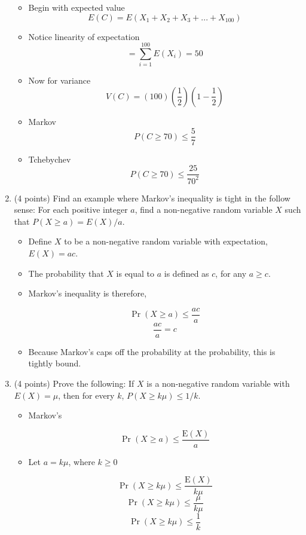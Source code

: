 \documentclass[11pt]{article}
\begin{document}
\begin{enumerate}
\begin{itemize}

	\item Begin with expected value
	      \[ E(C) = E(X_1 + X_2 + X_3 + ... + X_{100}) \]
	\item Notice linearity of expectation
	      \[ = \sum_{i = 1}^{100} E(X_i)  = 50 \]
	\item Now for variance
	      \[ V(C) = (100)\left(\frac{1}{2}\right)\left(1 - \frac{1}{2}\right) \]
	\item Markov
	      \[ P(C \ge 70) \le \frac{5}{7} \]
	\item Tchebychev
         \[ P(C \ge 70) \le \frac{25}{70^2} \]
         
\end{itemize}

\item (4 points) Find an example where Markov's inequality is tight in the
follow sense: For each  positive integer $a$, find a non-negative random
variable $X$ such that $P(X \geq a) = E(X)/a$.

	\begin{itemize}
		\item Define $X$ to be a non-negative random variable with expectation, $E(X) = ac$.
		\item The probability that $X$ is equal to $a$ is defined as $c$, for any $a \geq c$.
		\item Markov's inequality is therefore,
		
	         \[ \Pr(X \geq a) \leq \frac{ac}{a} \]
	         \[ \frac{ac}{a} = c\]
	         
	   \item Because Markov's caps off the probability at the probability, this is tightly bound.
	\end{itemize}

\item (4 points) Prove the following: If $X$ is a non-negative random variable
with $E(X) = \mu$, then for every $k$, $P(X \geq k\mu) \leq 1/k$.

\begin{itemize}

	\item Markov's
	
	     \[\Pr(X \geq a) \leq \frac{\textrm{E}(X)}{a}\]
	     
	\item Let $a = k\mu$, where $k \geq 0$
	
	     \[ \Pr(X \geq  k\mu) \leq \frac{\textrm{E}(X)}{ k\mu}\]
	     \[ \Pr(X \geq  k\mu) \leq \frac{\mu}{ k\mu}\]
	     \[ \Pr(X \geq  k\mu) \leq \frac{1}{k}\]

\end{itemize}

\end{enumerate}
\end{document}
